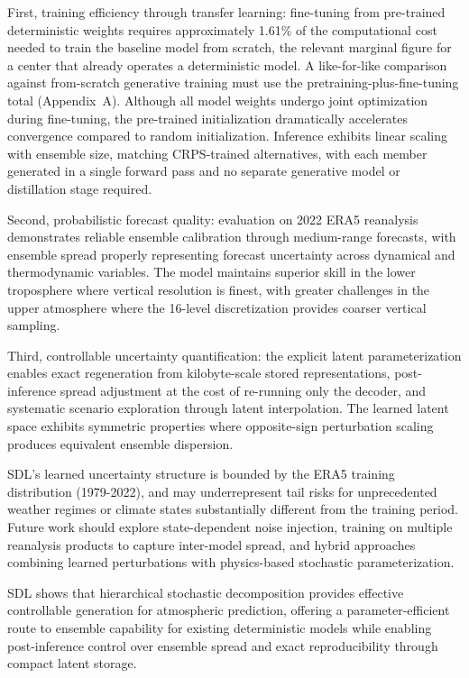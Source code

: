 \documentclass{agujournal2019}
\begin{document}
First, training efficiency through transfer learning: fine-tuning from pre-trained deterministic weights requires approximately 1.61\% of the computational cost needed to train the baseline model from scratch, the relevant marginal figure for a center that already operates a deterministic model. A like-for-like comparison against from-scratch generative training must use the pretraining-plus-fine-tuning total (Appendix~A). Although all model weights undergo joint optimization during fine-tuning, the pre-trained initialization dramatically accelerates convergence compared to random initialization. Inference exhibits linear scaling with ensemble size, matching CRPS-trained alternatives, with each member generated in a single forward pass and no separate generative model or distillation stage required.

Second, probabilistic forecast quality: evaluation on 2022 ERA5 reanalysis demonstrates reliable ensemble calibration through medium-range forecasts, with ensemble spread properly representing forecast uncertainty across dynamical and thermodynamic variables. The model maintains superior skill in the lower troposphere where vertical resolution is finest, with greater challenges in the upper atmosphere where the 16-level discretization provides coarser vertical sampling.

Third, controllable uncertainty quantification: the explicit latent parameterization enables exact regeneration from kilobyte-scale stored representations, post-inference spread adjustment at the cost of re-running only the decoder, and systematic scenario exploration through latent interpolation. The learned latent space exhibits symmetric properties where opposite-sign perturbation scaling produces equivalent ensemble dispersion.

SDL's learned uncertainty structure is bounded by the ERA5 training distribution (1979-2022), and may underrepresent tail risks for unprecedented weather regimes or climate states substantially different from the training period. Future work should explore state-dependent noise injection, training on multiple reanalysis products to capture inter-model spread, and hybrid approaches combining learned perturbations with physics-based stochastic parameterization.

SDL shows that hierarchical stochastic decomposition provides effective controllable generation for atmospheric prediction, offering a parameter-efficient route to ensemble capability for existing deterministic models while enabling post-inference control over ensemble spread and exact reproducibility through compact latent storage.
\end{document}
